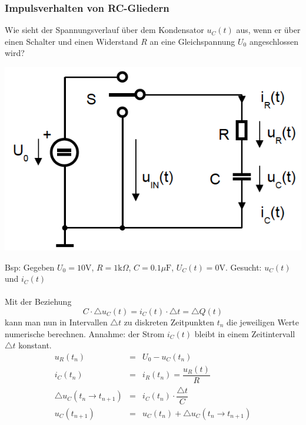 \subsubsection{Impulsverhalten von RC-Gliedern}
Wie sieht der Spannungsverlauf über dem Kondensator $u_C\left(t\right)$ aus, wenn er über einen Schalter und einen Widerstand $R$ an eine Gleichspannung $U_0$ angeschlossen wird?
\begin{center}
\includegraphics[scale=0.5]{../img/IV/IVf}
\end{center}
Bsp: Gegeben $U_0=10\text{V}$, $R=1\text{k}\Omega$, $C=0.1\mu\text{F}$, $U_C\left(t\right)=0\text{V}$. Gesucht: $u_C\left(t\right)$ und $i_C\left(t\right)$
\\\\
Mit der Beziehung 
\begin{equation}
\boxed{C\cdot \triangle u_C\left(t\right)=i_C\left(t\right)\cdot \triangle t=\triangle Q\left(t\right)}
\end{equation}
kann man nun in Intervallen $\triangle t$ zu diskreten Zeitpunkten $t_n$ die jeweiligen Werte numerische berechnen. Annahme: der Strom $i_C\left(t\right)$ bleibt in einem Zeitintervall $\triangle t$ konstant.
\begin{equation*} 
\begin{array}{lll} 
u_R\left(t_n\right)&=&U_0-u_C\left(t_n\right)\\
i_C\left(t_n\right)&=&i_R\left(t_n\right)=\dfrac{u_R\left(t\right)}{R}\\
\triangle u_C\left(t_n\rightarrow t_{n+1}\right)&=&i_C\left(t_n\right)\cdot \dfrac{\triangle t}{C}\\
u_C\left(t_{n+1}\right)&=&u_C\left(t_n\right)+\triangle u_C\left(t_n\rightarrow t_{n+1}\right)
\end{array} 
\end{equation*} 
